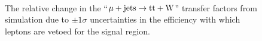 \clearpage
\begin{figure}[!h]
  \centering
   \\
  \caption{\label{fig:tfSyst_leptonveto_muToTtw} The relative change in the
    ``$\mu + \textrm{jets} \rightarrow \mathrm{tt+W}$'' transfer factors from
    simulation due to $\pm1\sigma$ uncertainties in the efficiency
    with which leptons are vetoed for the signal region.  }
\end{figure}


